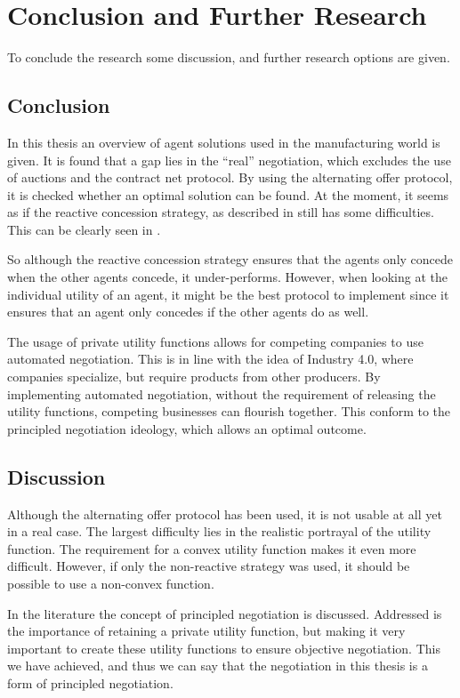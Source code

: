\chapter{Conclusion and Further Research}
To conclude the research some discussion, and further research options are given.
\section{Conclusion}
In this thesis an overview of agent solutions used in the manufacturing world is given. It is found that a gap lies in the ``real'' negotiation, which excludes the use of auctions and the contract net protocol. By using the alternating offer protocol, it is checked whether an optimal solution can be found. At the moment, it seems as if the reactive concession strategy, as described in \citet{zheng2015automated} still has some difficulties. This can be clearly seen in . 

So although the reactive concession strategy ensures that the agents only concede when the other agents concede, it under-performs. However, when looking at the individual utility of an agent, it might be the best protocol to implement since it ensures that an agent only concedes if the other agents do as well.

The usage of private utility functions allows for competing companies to use automated negotiation. This is in line with the idea of Industry 4.0, where companies specialize, but require products from other producers. By implementing automated negotiation, without the requirement of releasing the utility functions, competing businesses can flourish together. This conform to the principled negotiation ideology, which allows an optimal outcome.

\section{Discussion}
Although the alternating offer protocol has been used, it is not usable at all yet in a real case. The largest difficulty lies in the realistic portrayal of the utility function. The requirement for a convex utility function makes it even more difficult. However, if only the non-reactive strategy was used, it should be possible to use a non-convex function.

In the literature the concept of principled negotiation is discussed. Addressed is the importance of retaining a private utility function, but making it very important to create these utility functions to ensure objective negotiation. This we have achieved, and thus we can say that the negotiation in this thesis is a form of principled negotiation.

